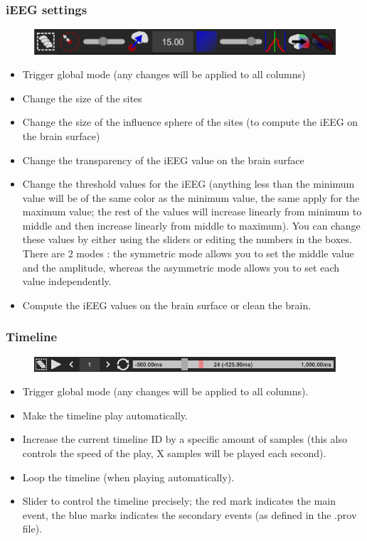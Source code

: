\documentclass[a4paper]{article}
\begin{document}
\subsubsection{iEEG settings}
\begin{figure}[H]
\begin{center}
\includegraphics[scale=0.45]{iEEGSettings.png}
\end{center}
\end{figure}
\begin{itemize}
\item Trigger global mode (any changes will be applied to all columns)
\item Change the size of the sites
\item Change the size of the influence sphere of the sites (to compute the iEEG on the brain surface)
\item Change the transparency of the iEEG value on the brain surface
\item Change the threshold values for the iEEG (anything less than the minimum value will be of the same color as the minimum value, the same apply for the maximum value; the rest of the values will increase linearly from minimum to middle and then increase linearly from middle to maximum). You can change these values by either using the sliders or editing the numbers in the boxes. There are 2 modes : the symmetric mode allows you to set the middle value and the amplitude, whereas the asymmetric mode allows you to set each value independently.
\item Compute the iEEG values on the brain surface or clean the brain.
\end{itemize}
\subsubsection{Timeline}
\begin{figure}[H]
\begin{center}
\includegraphics[scale=0.45]{Timeline.png}
\end{center}
\end{figure}
\begin{itemize}
\item Trigger global mode (any changes will be applied to all columns).
\item Make the timeline play automatically.
\item Increase the current timeline ID by a specific amount of samples (this also controls the speed of the play, X samples will be played each second).
\item Loop the timeline (when playing automatically).
\item Slider to control the timeline precisely; the red mark indicates the main event, the blue marks indicates the secondary events (as defined in the .prov file).
\end{itemize}
\end{document}
